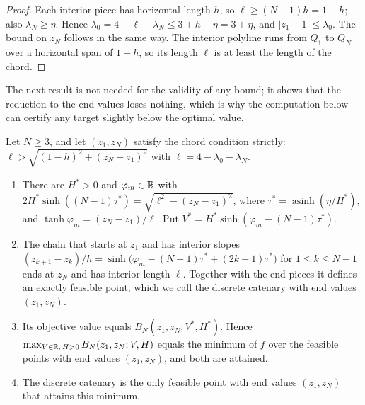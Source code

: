 \begin{proof}
Each interior piece has horizontal length $h$, so $\ell \ge (N-1)h = 1 - h$; also $\lambda_N \ge \eta$.
Hence $\lambda_0 = 4 - \ell - \lambda_N \le 3 + h - \eta = 3 + \eta$, and $|z_1 - 1| \le \lambda_0$.
The bound on $z_N$ follows in the same way.
The interior polyline runs from $Q_1$ to $Q_N$ over a horizontal span of $1 - h$, so its length $\ell$ is at least the length of the chord.
\end{proof}

The next result is not needed for the validity of any bound; it shows that the reduction to the end values loses nothing, which is why the computation below can certify any target slightly below the optimal value.

\begin{proposition}\label{prop:chain-weierstrass}
Let $N \ge 3$, and let $(z_1, z_N)$ satisfy the chord condition strictly: $\ell > \sqrt{(1-h)^2 + (z_N - z_1)^2}$ with $\ell = 4 - \lambda_0 - \lambda_N$.
\begin{enumerate}
\item[(i)] There are $H^* > 0$ and $\varphi_m \in \mathbb{R}$ with $2H^*\sinh((N-1)\tau^*) = \sqrt{\ell^2 - (z_N - z_1)^2}$, where $\tau^* = \operatorname{asinh}(\eta/H^*)$, and $\tanh\varphi_m = (z_N - z_1)/\ell$. Put $V^* = H^*\sinh(\varphi_m - (N-1)\tau^*)$.
\item[(ii)] The chain that starts at $z_1$ and has interior slopes $(z_{k+1} - z_k)/h = \sinh\bigl(\varphi_m - (N-1)\tau^* + (2k-1)\tau^*\bigr)$ for $1 \le k \le N-1$ ends at $z_N$ and has interior length $\ell$. Together with the end pieces it defines an exactly feasible point, which we call the discrete catenary with end values $(z_1, z_N)$.
\item[(iii)] Its objective value equals $B_N(z_1, z_N; V^*, H^*)$. Hence $\max_{V\in\mathbb{R},\,H>0} B_N(z_1, z_N; V, H)$ equals the minimum of $f$ over the feasible points with end values $(z_1, z_N)$, and both are attained.
\item[(iv)] The discrete catenary is the only feasible point with end values $(z_1, z_N)$ that attains this minimum.
\end{enumerate}
\end{proposition}

